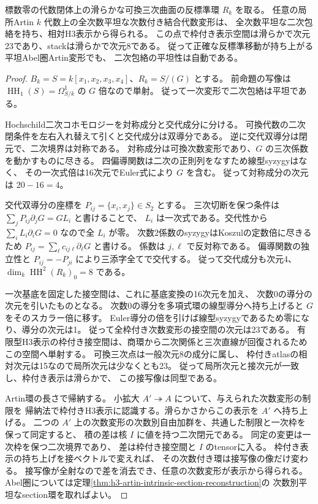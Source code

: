 \begin{theorem}\label{thm:h3-commutative-artin-envelope-automatic}
標数零の代数閉体上の滑らかな可換三次曲面の反標準環 $R_k$ を取る。
任意の局所Artin $k$ 代数上の全次数平坦な次数付き結合代数変形は、
全次数平坦な二次包絡を持ち、相対H3表示から得られる。
この点で枠付き表示空間は滑らかで次元23であり、stackは滑らかで次元8である。
従って正確な反標準移動が持ち上がる平坦Abel圏Artin変形でも、
二次包絡の平坦性は自動である。
\end{theorem}
\begin{proof}
$B_k=S=k[x_1,x_2,x_3,x_4]$、$R_k=S/(G)$ とする。
前命題の写像は $\operatorname{HH}_1(S)=\Omega^1_{S/k}$ の $G$ 倍なので単射。
従って一次変形で二次包絡は平坦である。

Hochschild二次コホモロジーを対称成分と交代成分に分ける。
可換代数の二次閉条件を左右入れ替えて引くと交代成分は双導分である。
逆に交代双導分は閉元で、二次境界は対称である。
対称成分は可換次数変形であり、$G$ の三次係数を動かすものに尽きる。
四偏導関数は二次の正則列をなすため線型syzygyはなく、
その一次式倍は16次元でEuler式により $G$ を含む。
従って対称成分の次元は $20-16=4$。

交代双導分の座標を $P_{ij}=\{x_i,x_j\}\in S_2$ とする。
三次切断を保つ条件は $\sum_jP_{ij}\partial_j G=G L_i$ と書けることで、
$L_i$ は一次式である。交代性から $\sum_iL_i\partial_iG=0$ なので全 $L_i$ が零。
次数2係数のsyzygyはKoszulの定数倍に尽きるため
$P_{ij}=\sum_\ell c_{ij\ell}\partial_\ell G$ と書ける。
係数は $j,\ell$ で反対称である。
偏導関数の独立性と $P_{ij}=-P_{ji}$ により三添字全てで交代する。
従って交代成分も次元4、$\dim_k\operatorname{HH}^2(R_k)_0=8$ である。

一次基底を固定した接空間は、これに基底変換の16次元を加え、
次数0の導分の次元を引いたものとなる。
次数0の導分を多項式環の線型導分へ持ち上げると $G$ をそのスカラー倍に移す。
Euler導分の倍を引けば線型syzygyであるため零になり、導分の次元は1。
従って全枠付き次数変形の接空間の次元は23である。
有限型H3表示の枠付き接空間は、商環から二次関係と三次直線が回復されるため
この空間へ単射する。
可換三次点は一般次元8の成分に属し、
枠付きatlasの相対次元は15なので局所次元は少なくとも23。
従って局所次元と接次元が一致し、枠付き表示は滑らかで、
この接写像は同型である。

Artin環の長さで帰納する。
小拡大 $A'\twoheadrightarrow A$ について、与えられた次数変形の制限を
帰納法で枠付きH3表示に認識する。滑らかさからこの表示を $A'$ へ持ち上げる。
二つの $A'$ 上の次数変形の次数別自由加群を、共通した制限と一次枠を保って同定すると、
積の差は核 $I$ に値を持つ二次閉元である。
同定の変更は一次枠を保つ二次境界であり、
差は枠付き接空間と $I$ のtensorに入る。
枠付き表示の持ち上げを接ベクトルで変えれば、
その次数付き環は接写像の像だけ変わる。
接写像が全射なので差を消去でき、任意の次数変形が表示から得られる。
Abel圏については定理\ref{thm:h3-artin-intrinsic-section-reconstruction}の
次数別平坦なsection環を取ればよい。
\end{proof}

